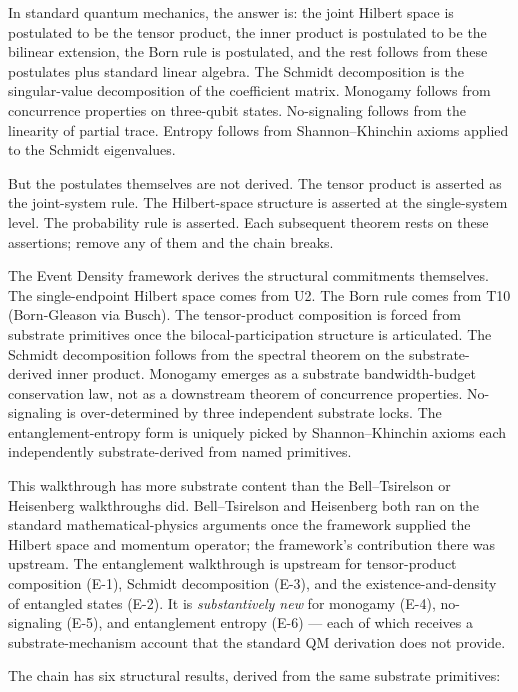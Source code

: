\documentclass[11pt,a4paper]{article}
\begin{document}
In standard quantum mechanics, the answer is: the joint Hilbert space is postulated to be the tensor product, the inner product is postulated to be the bilinear extension, the Born rule is postulated, and the rest follows from these postulates plus standard linear algebra. The Schmidt decomposition is the singular-value decomposition of the coefficient matrix. Monogamy follows from concurrence properties on three-qubit states. No-signaling follows from the linearity of partial trace. Entropy follows from Shannon--Khinchin axioms applied to the Schmidt eigenvalues.

But the postulates themselves are not derived. The tensor product is asserted as the joint-system rule. The Hilbert-space structure is asserted at the single-system level. The probability rule is asserted. Each subsequent theorem rests on these assertions; remove any of them and the chain breaks.

The Event Density framework derives the structural commitments themselves. The single-endpoint Hilbert space comes from U2. The Born rule comes from T10 (Born-Gleason via Busch). The tensor-product composition is forced from substrate primitives once the bilocal-participation structure is articulated. The Schmidt decomposition follows from the spectral theorem on the substrate-derived inner product. Monogamy emerges as a substrate bandwidth-budget conservation law, not as a downstream theorem of concurrence properties. No-signaling is over-determined by three independent substrate locks. The entanglement-entropy form is uniquely picked by Shannon--Khinchin axioms each independently substrate-derived from named primitives.

This walkthrough has more substrate content than the Bell--Tsirelson or Heisenberg walkthroughs did. Bell--Tsirelson and Heisenberg both ran on the standard mathematical-physics arguments once the framework supplied the Hilbert space and momentum operator; the framework's contribution there was upstream. The entanglement walkthrough is upstream for tensor-product composition (E-1), Schmidt decomposition (E-3), and the existence-and-density of entangled states (E-2). It is \emph{substantively new} for monogamy (E-4), no-signaling (E-5), and entanglement entropy (E-6) --- each of which receives a substrate-mechanism account that the standard QM derivation does not provide.

The chain has six structural results, derived from the same substrate primitives:
\end{document}
